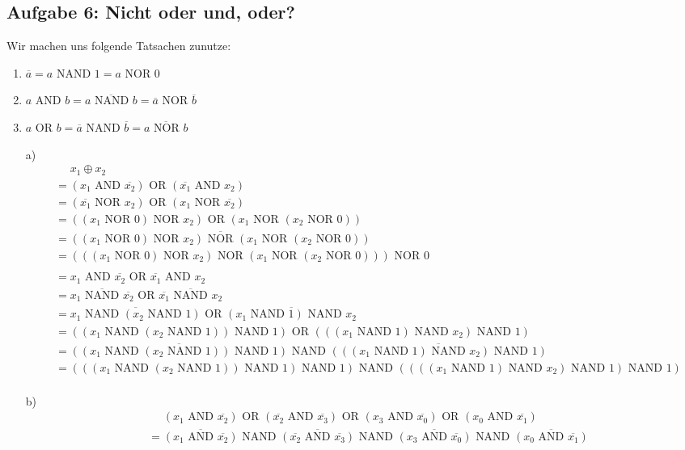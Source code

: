 \documentclass{article}
\def\orr{\text{ OR }}
\def\andd{\text{ AND }}
\def\nor{\text{ NOR }}
\def\nand{\text{ NAND }}
\newcommand{\nyet}{\overline}
\begin{document}
	\subsection*{Aufgabe 6: Nicht oder und, oder?}
	Wir machen uns folgende Tatsachen zunutze:
	\begin{enumerate}
		\item $\nyet{a} = a \nand 1 = a \nor 0$
		\item $a \andd b = \nyet{a \nand b} = \nyet{a} \nor \nyet{b}$
		\item $a \orr b = \nyet{a} \nand \nyet{b} = \nyet{a \nor b}$
	\end{enumerate}
	\begin{enumerate}
		\item[a)]
		\begin{align*}
			&\phantom{=} x_1 \oplus x_2 \\
			&= (x_1 \andd \nyet{x_2}) \orr (\nyet{x_1} \andd x_2) \\
			&= (\nyet{x_1} \nor x_2) \orr (x_1 \nor \nyet{x_2}) \\
			&= ((x_1 \nor 0) \nor x_2) \orr (x_1 \nor (x_2 \nor 0)) \\
			&= \nyet{((x_1 \nor 0) \nor x_2) \nor (x_1 \nor (x_2 \nor 0))} \\
			&= (((x_1 \nor 0) \nor x_2) \nor (x_1 \nor (x_2 \nor 0))) \nor 0 \\
			\\
			&= x_1 \andd \nyet{x_2} \orr \nyet{x_1} \andd x_2 \\
			&= \nyet{x_1 \nand \nyet{x_2}} \orr \nyet{\nyet{x_1} \nand x_2} \\
			&= \nyet{x_1 \nand (x_2 \nand 1)} \orr \nyet{(x_1 \nand 1) \nand x_2} \\
			&= ((x_1 \nand (x_2 \nand 1)) \nand 1) \orr (((x_1 \nand 1) \nand x_2) \nand 1) \\
			&= \nyet{((x_1 \nand (x_2 \nand 1)) \nand 1)} \nand \nyet{(((x_1 \nand 1) \nand x_2) \nand 1)} \\
			&= (((x_1 \nand (x_2 \nand 1)) \nand 1) \nand 1) \nand ((((x_1 \nand 1) \nand x_2) \nand 1) \nand 1) \\
		\end{align*}
		\item[b)]
		\begin{align*}
			&\phantom{=} (x_1 \andd \nyet{x_2}) \orr (\nyet{x_2} \andd \nyet{x_3}) \orr (x_3 \andd \nyet{x_0}) \orr (x_0 \andd \nyet{x_1}) \\
			&= \nyet{(x_1 \andd \nyet{x_2})} \nand \nyet{(\nyet{x_2} \andd \nyet{x_3})} \nand \nyet{(x_3 \andd \nyet{x_0})} \nand \nyet{(x_0 \andd \nyet{x_1})} \\

\end{align*}
\end{enumerate}
\end{document}
